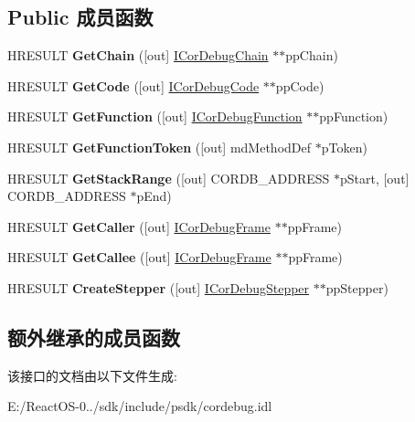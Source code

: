 \subsection*{Public 成员函数}
\begin{DoxyCompactItemize}
\item 
\mbox{\label{interface_i_cor_debug_frame_ae823951ddb7c6e6d4c605064254ce6ea}} 
H\+R\+E\+S\+U\+LT {\bfseries Get\+Chain} (\mbox{[}out\mbox{]} \hyperlink{interface_i_cor_debug_chain}{I\+Cor\+Debug\+Chain} $\ast$$\ast$pp\+Chain)
\item 
\mbox{\label{interface_i_cor_debug_frame_ad010b7924a6b24c46ad4e11fcbe9cd89}} 
H\+R\+E\+S\+U\+LT {\bfseries Get\+Code} (\mbox{[}out\mbox{]} \hyperlink{interface_i_cor_debug_code}{I\+Cor\+Debug\+Code} $\ast$$\ast$pp\+Code)
\item 
\mbox{\label{interface_i_cor_debug_frame_a1ad9a14bf6d98e8c118a04c9f96501de}} 
H\+R\+E\+S\+U\+LT {\bfseries Get\+Function} (\mbox{[}out\mbox{]} \hyperlink{interface_i_cor_debug_function}{I\+Cor\+Debug\+Function} $\ast$$\ast$pp\+Function)
\item 
\mbox{\label{interface_i_cor_debug_frame_a0aca34371ba82538ea306d0ad1610b39}} 
H\+R\+E\+S\+U\+LT {\bfseries Get\+Function\+Token} (\mbox{[}out\mbox{]} md\+Method\+Def $\ast$p\+Token)
\item 
\mbox{\label{interface_i_cor_debug_frame_a3dcb4897823fd39d55ed9cb753754414}} 
H\+R\+E\+S\+U\+LT {\bfseries Get\+Stack\+Range} (\mbox{[}out\mbox{]} C\+O\+R\+D\+B\+\_\+\+A\+D\+D\+R\+E\+SS $\ast$p\+Start, \mbox{[}out\mbox{]} C\+O\+R\+D\+B\+\_\+\+A\+D\+D\+R\+E\+SS $\ast$p\+End)
\item 
\mbox{\label{interface_i_cor_debug_frame_ab0ab4249fd01801c8abcbfd41e62d9a1}} 
H\+R\+E\+S\+U\+LT {\bfseries Get\+Caller} (\mbox{[}out\mbox{]} \hyperlink{interface_i_cor_debug_frame}{I\+Cor\+Debug\+Frame} $\ast$$\ast$pp\+Frame)
\item 
\mbox{\label{interface_i_cor_debug_frame_a3a4df07029b8ffda8ba2178b1703f761}} 
H\+R\+E\+S\+U\+LT {\bfseries Get\+Callee} (\mbox{[}out\mbox{]} \hyperlink{interface_i_cor_debug_frame}{I\+Cor\+Debug\+Frame} $\ast$$\ast$pp\+Frame)
\item 
\mbox{\label{interface_i_cor_debug_frame_a3d9d7e3c6f75fbadf1800ec762b5eca1}} 
H\+R\+E\+S\+U\+LT {\bfseries Create\+Stepper} (\mbox{[}out\mbox{]} \hyperlink{interface_i_cor_debug_stepper}{I\+Cor\+Debug\+Stepper} $\ast$$\ast$pp\+Stepper)
\end{DoxyCompactItemize}
\subsection*{额外继承的成员函数}


该接口的文档由以下文件生成\+:\begin{DoxyCompactItemize}
\item 
E\+:/\+React\+O\+S-\/0../sdk/include/psdk/cordebug.\+idl\end{DoxyCompactItemize}
